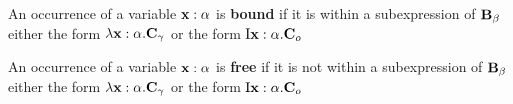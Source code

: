 \begin{define}
    An occurrence of a variable $\bold{x}: \alpha$ is \textbf{bound} if it is within a subexpression of $\bold{B}_{\beta}$ either the form $\lambda \bold{x}: {\alpha} . \bold{C}_{\gamma}$ or the form $\text{I}\bold{x}: {\alpha} . \bold{C}_{o}$
\end{define}
\begin{define}
    An occurrence of a variable $\bold{x}: \alpha$ is \textbf{free} if it is not within a subexpression of $\bold{B}_{\beta}$ either the form $\lambda \bold{x}: {\alpha} . \bold{C}_{\gamma}$ or the form $\text{I}\bold{x}: {\alpha} . \bold{C}_{o}$
\end{define}